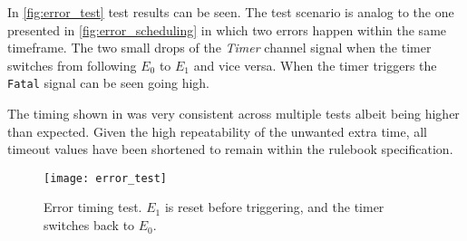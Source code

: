 In \autoref{fig:error_test} test results can be seen. The test scenario is analog to the one presented in \autoref{fig:error_scheduling} in which two errors happen within the same timeframe. The two small drops of the \textit{Timer} channel signal when the timer switches from following $E_0$ to $E_1$ and vice versa.
When the timer triggers the \texttt{Fatal} signal can be seen going high.

The timing shown in was very consistent across multiple tests albeit being higher than expected. Given the high repeatability of the unwanted extra time, all timeout values have been shortened to remain within the rulebook specification.
\begin{figure}[h]
	\centering
	\texttt{[image: error\_test]}
	\caption{Error timing test. $E_1$ is reset before triggering, and the timer switches back to $E_0$.}
	\label{fig:error_test}
\end{figure}
\newpage

